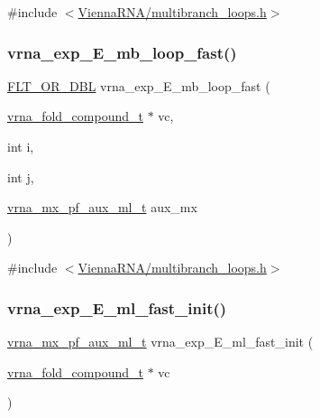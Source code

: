 {\ttfamily \#include $<$\mbox{\hyperlink{multibranch__loops_8h}{Vienna\+R\+N\+A/multibranch\+\_\+loops.\+h}}$>$}

\mbox{\label{group__loops_ga604313896e5f0ec91b6c44460707d036}} 
\subsubsection{\texorpdfstring{vrna\+\_\+exp\+\_\+\+E\+\_\+mb\+\_\+loop\+\_\+fast()}{vrna\_exp\_E\_mb\_loop\_fast()}}
{\footnotesize\ttfamily \mbox{\hyperlink{group__data__structures_ga31125aeace516926bf7f251f759b6126}{F\+L\+T\+\_\+\+O\+R\+\_\+\+D\+BL}} vrna\+\_\+exp\+\_\+\+E\+\_\+mb\+\_\+loop\+\_\+fast (\begin{DoxyParamCaption}\item[{\mbox{\hyperlink{group__fold__compound_ga1b0cef17fd40466cef5968eaeeff6166}{vrna\+\_\+fold\+\_\+compound\+\_\+t}} $\ast$}]{vc,  }\item[{int}]{i,  }\item[{int}]{j,  }\item[{\mbox{\hyperlink{group__loops_ga39a8cc1385dcb542a60a9393cde6a1e3}{vrna\+\_\+mx\+\_\+pf\+\_\+aux\+\_\+ml\+\_\+t}}}]{aux\+\_\+mx }\end{DoxyParamCaption})}



{\ttfamily \#include $<$\mbox{\hyperlink{multibranch__loops_8h}{Vienna\+R\+N\+A/multibranch\+\_\+loops.\+h}}$>$}

\mbox{\label{group__loops_gace7640e156900ba8b01edc1a7136b2b7}} 
\subsubsection{\texorpdfstring{vrna\+\_\+exp\+\_\+\+E\+\_\+ml\+\_\+fast\+\_\+init()}{vrna\_exp\_E\_ml\_fast\_init()}}
{\footnotesize\ttfamily \mbox{\hyperlink{group__loops_ga39a8cc1385dcb542a60a9393cde6a1e3}{vrna\+\_\+mx\+\_\+pf\+\_\+aux\+\_\+ml\+\_\+t}} vrna\+\_\+exp\+\_\+\+E\+\_\+ml\+\_\+fast\+\_\+init (\begin{DoxyParamCaption}\item[{\mbox{\hyperlink{group__fold__compound_ga1b0cef17fd40466cef5968eaeeff6166}{vrna\+\_\+fold\+\_\+compound\+\_\+t}} $\ast$}]{vc }\end{DoxyParamCaption})}



